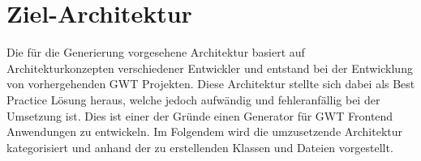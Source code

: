 \section{Ziel-Architektur}\label{AufBZielArchitektur}
Die für die Generierung vorgesehene Architektur basiert auf 
Architekturkonzepten verschiedener Entwickler und entstand bei der Entwicklung
von vorhergehenden GWT Projekten. Diese Architektur stellte sich dabei als Best
Practice Lösung heraus, welche jedoch aufwändig und fehleranfällig bei der
Umsetzung ist. Dies ist einer der Gründe einen Generator für GWT Frontend
Anwendungen zu entwickeln. Im Folgendem wird die umzusetzende Architektur
kategorisiert und anhand der zu erstellenden Klassen und Dateien vorgestellt.
